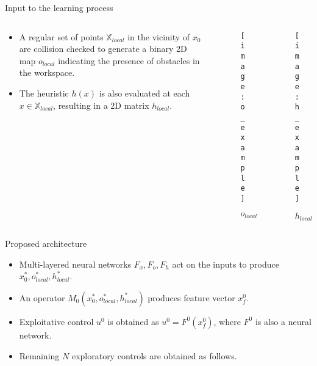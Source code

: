 
\begin{columns}[t]
	\begin{column}{0.65\textwidth}
		\begin{block} {\large Input to the learning process}
			\begin{columns}[T]
				\centering
				\begin{column}{0.59\textwidth}
					\begin{itemize}
						\item A regular set of points $\mathbb{X}_{local}$ in the vicinity of $x_0$ are collision checked to generate a binary 2D map $o_{local}$ indicating the presence of obstacles in the workspace.
						\item The heuristic $h(x)$ is also evaluated at each $x \in \mathbb{X}_{local}$, resulting in a 2D matrix $h_{local}$.
					\end{itemize}
				\end{column}
				\begin{column}{0.20\textwidth}
					\centering
					\begin{figure}
					\texttt{[image: o\_example]}
					\caption{$o_{local}$} 
					\end{figure}
				\end{column}
				\begin{column}{0.20\textwidth}
					\centering
					\begin{figure}
					\texttt{[image: h\_example]}
					\caption{$h_{local}$} 
					\end{figure}
					\vspace{0.1in}
				\end{column}
			\end{columns}
		\vspace{-0.4in}
		\end{block}
		\begin{block}{\large Proposed architecture}
			\begin{itemize}
			\item Multi-layered neural networks $F_x, F_o, F_h$ act on the inputs to produce $x_0^*, o_{local}^*, h_{local}^*$. 
			\item An operator $M_0(x_0^*, o_{local}^*,h_{local}^*)$ produces feature vector  $x_f^0$.
			\item Exploitative control $u^0$ is obtained as $u^0 = F^0(x_f^0)$, where $F^0$ is also a neural network.
			\item Remaining $N$ exploratory controls are obtained as follows.
			\vspace{-.1in}

\end{itemize}
\end{block}
\end{column}
\end{columns}
